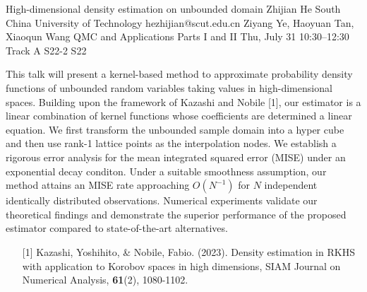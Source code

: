 \begin{talk}
  {High-dimensional density estimation on  unbounded domain}%
  {Zhijian He}%
  {South China University of Technology}%
  {hezhijian@scut.edu.cn}%
  {Ziyang Ye, Haoyuan Tan, Xiaoqun Wang}%
  {QMC and Applications Parts I and II}%
  {Thu, July 31 10:30–12:30 Track A}%
  {S22-2}%
  {S22}%
				
			
This talk will present a kernel-based method to approximate probability density functions of unbounded random variables taking values in high-dimensional spaces. Building upon the framework of Kazashi and Nobile [1], our estimator is a linear combination of kernel functions whose coefficients are determined a linear equation. We first transform the unbounded sample domain into a hyper cube and then use rank-1 lattice points as the interpolation nodes.
We establish a rigorous error analysis for the mean integrated squared error (MISE) under an exponential decay conditon.  Under a suitable smoothness assumption, our method attains an MISE rate  approaching $O(N^{-1})$ for $N$ independent identically distributed observations. Numerical experiments validate our theoretical findings and demonstrate the superior performance of the proposed estimator compared to state-of-the-art alternatives.
\medskip


\begin{enumerate}
	\item[{[1]}] Kazashi, Yoshihito, \& Nobile, Fabio. (2023). Density estimation in {RKHS} with application to Korobov spaces in high dimensions, SIAM Journal on Numerical Analysis, \textbf{61}(2), 1080-1102.
\end{enumerate}

\end{talk}


